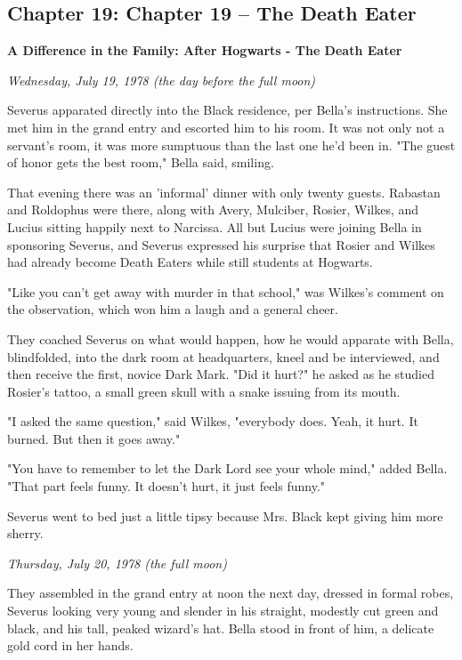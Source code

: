 \documentclass[a4paper,11pt]{article}
\begin{document}
\subsection{Chapter 19: Chapter 19 – The Death Eater}

\textbf{A Difference in the Family: After Hogwarts - The Death Eater}

\emph{Wednesday, July 19, 1978 (the day before the full moon)}

Severus apparated directly into the Black residence, per Bella's instructions. She met him in the grand entry and escorted him to his room. It was not only not a servant's room, it was more sumptuous than the last one he'd been in. "The guest of honor gets the best room," Bella said, smiling.

That evening there was an 'informal' dinner with only twenty guests. Rabastan and Roldophus were there, along with Avery, Mulciber, Rosier, Wilkes, and Lucius sitting happily next to Narcissa. All but Lucius were joining Bella in sponsoring Severus, and Severus expressed his surprise that Rosier and Wilkes had already become Death Eaters while still students at Hogwarts.

"Like you can't get away with murder in that school," was Wilkes's comment on the observation, which won him a laugh and a general cheer.

They coached Severus on what would happen, how he would apparate with Bella, blindfolded, into the dark room at headquarters, kneel and be interviewed, and then receive the first, novice Dark Mark. "Did it hurt?" he asked as he studied Rosier's tattoo, a small green skull with a snake issuing from its mouth.

"I asked the same question," said Wilkes, "everybody does. Yeah, it hurt. It burned. But then it goes away."

"You have to remember to let the Dark Lord see your whole mind," added Bella. "That part feels funny. It doesn't hurt, it just feels funny."

Severus went to bed just a little tipsy because Mrs. Black kept giving him more sherry.

\emph{Thursday, July 20, 1978 (the full moon)}

They assembled in the grand entry at noon the next day, dressed in formal robes, Severus looking very young and slender in his straight, modestly cut green and black, and his tall, peaked wizard's hat. Bella stood in front of him, a delicate gold cord in her hands.
\end{document}
